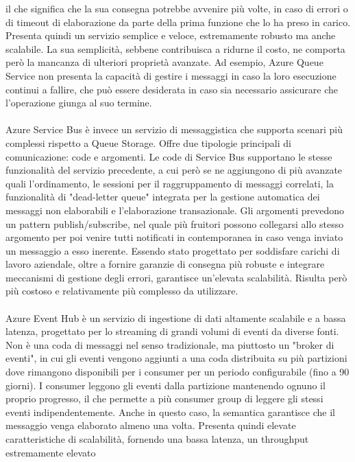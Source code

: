 il che significa che la sua consegna potrebbe avvenire più volte,
in caso di errori o di timeout di elaborazione da parte della prima funzione che lo ha preso in carico.
Presenta quindi un servizio semplice e veloce,
estremamente robusto ma anche scalabile.
La sua semplicità, sebbene contribuisca a ridurne il costo,
ne comporta però la mancanza di ulteriori proprietà avanzate.
Ad esempio, Azure Queue Service non presenta la capacità 
di gestire i messaggi in caso la loro esecuzione continui a fallire, 
che può essere desiderata in caso sia necessario assicurare che l'operazione giunga al suo termine.\\
\\
Azure Service Bus è invece un servizio di messaggistica
che supporta scenari più complessi rispetto a Queue Storage. 
Offre due tipologie principali di comunicazione: code e argomenti. 
Le code di Service Bus supportano le stesse funzionalità del servizio precedente,
a cui però se ne aggiungono di più avanzate quali l'ordinamento, 
le sessioni per il raggruppamento di messaggi correlati, 
la funzionalità di "dead-letter queue" integrata per la gestione automatica dei messaggi non elaborabili e 
l'elaborazione transazionale. 
Gli argomenti prevedono un pattern publish/subscribe,
nel quale più fruitori possono collegarsi allo stesso argomento per poi 
venire tutti notificati in contemporanea in caso venga inviato un messaggio a esso inerente.
Essendo stato progettato per soddisfare carichi di lavoro aziendale,
oltre a fornire garanzie di consegna più robuste e 
integrare meccanismi di gestione degli errori,
garantisce un'elevata scalabilità.
Risulta però più costoso e relativamente più complesso da utilizzare.\\
\\
Azure Event Hub è un servizio di ingestione di dati altamente scalabile e a bassa latenza, 
progettato per lo streaming di grandi volumi di eventi da diverse fonti. 
Non è una coda di messaggi nel senso tradizionale, 
ma piuttosto un "broker di eventi", 
in cui gli eventi vengono aggiunti a una coda distribuita su più partizioni 
dove rimangono disponibili per i consumer per un periodo configurabile (fino a 90 giorni). 
I consumer leggono gli eventi dalla partizione mantenendo ognuno il proprio progresso, 
il che permette a più consumer group di leggere gli stessi eventi indipendentemente. 
Anche in questo caso, la semantica garantisce che il messaggio venga elaborato almeno una volta.
Presenta quindi elevate caratteristiche di scalabilità, 
fornendo una bassa latenza, un throughput estremamente elevato
